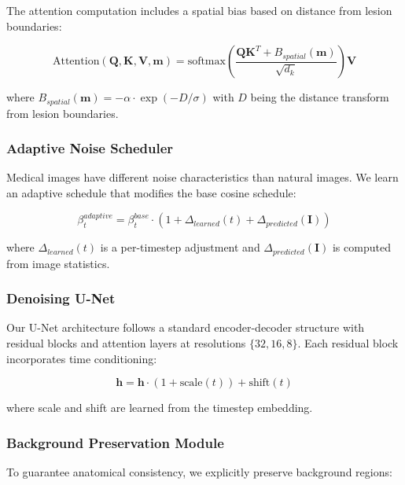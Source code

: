 \documentclass[10pt,twocolumn]{article}
\begin{document}
The attention computation includes a spatial bias based on distance from lesion boundaries:

\begin{equation}
\text{Attention}(\mathbf{Q}, \mathbf{K}, \mathbf{V}, \mathbf{m}) = \text{softmax}\left(\frac{\mathbf{Q}\mathbf{K}^T + B_{spatial}(\mathbf{m})}{\sqrt{d_k}}\right)\mathbf{V}
\end{equation}

where $B_{spatial}(\mathbf{m}) = -\alpha \cdot \exp(-D/\sigma)$ with $D$ being the distance transform from lesion boundaries.

\subsubsection{Adaptive Noise Scheduler}

Medical images have different noise characteristics than natural images. We learn an adaptive schedule that modifies the base cosine schedule:

\begin{equation}
\beta_t^{adaptive} = \beta_t^{base} \cdot (1 + \Delta_{learned}(t) + \Delta_{predicted}(\mathbf{I}))
\end{equation}

where $\Delta_{learned}(t)$ is a per-timestep adjustment and $\Delta_{predicted}(\mathbf{I})$ is computed from image statistics.

\subsubsection{Denoising U-Net}

Our U-Net architecture follows a standard encoder-decoder structure with residual blocks and attention layers at resolutions $\{32, 16, 8\}$. Each residual block incorporates time conditioning:

\begin{equation}
\mathbf{h} = \mathbf{h} \cdot (1 + \text{scale}(t)) + \text{shift}(t)
\end{equation}

where scale and shift are learned from the timestep embedding.

\subsubsection{Background Preservation Module}

To guarantee anatomical consistency, we explicitly preserve background regions:
\end{document}
